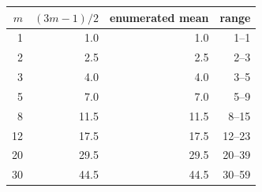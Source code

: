 \begin{tabular}{rrrr}
\toprule
$m$ & $(3m-1)/2$ & enumerated mean & range \\
\midrule
1 & 1.0 & 1.0 & 1--1 \\
2 & 2.5 & 2.5 & 2--3 \\
3 & 4.0 & 4.0 & 3--5 \\
5 & 7.0 & 7.0 & 5--9 \\
8 & 11.5 & 11.5 & 8--15 \\
12 & 17.5 & 17.5 & 12--23 \\
20 & 29.5 & 29.5 & 20--39 \\
30 & 44.5 & 44.5 & 30--59 \\
\bottomrule
\end{tabular}
